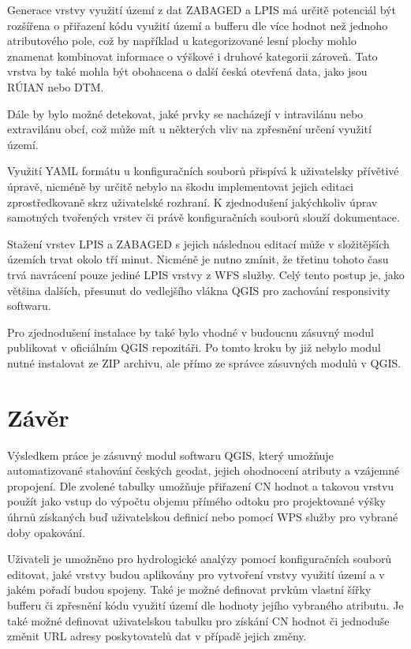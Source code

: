 \documentclass[a4paper,oneside,12pt]{book}
\begin{document}
\hspace{10mm} Generace vrstvy využití území z dat ZABAGED a LPIS má určitě potenciál být rozšířena o přiřazení kódu využití území a bufferu dle více hodnot než jednoho atributového pole, což by například u kategorizované lesní plochy mohlo znamenat kombinovat informace o výškové i druhové kategorii zároveň. Tato vrstva by také mohla být obohacena o další česká otevřená data, jako jsou RÚIAN nebo DTM.

\hspace{10mm} Dále by bylo možné detekovat, jaké prvky se nacházejí v intravilánu nebo extravilánu obcí, což může mít u některých vliv na zpřesnění určení využití území.

\hspace{10mm} Využití YAML formátu u konfiguračních souborů přispívá k uživatelsky přívětivé úpravě, nicméně by určitě nebylo na škodu implementovat jejich editaci zprostředkovaně skrz uživatelské rozhraní. K zjednodušení jakýchkoliv úprav samotných tvořených vrstev či právě konfiguračních souborů slouží dokumentace.

\hspace{10mm} Stažení vrstev LPIS a ZABAGED s jejich následnou editací může v složitějších územích trvat okolo tří minut. Nicméně je nutno zmínit, že třetinu tohoto času trvá navrácení pouze jediné LPIS vrstvy z WFS služby. Celý tento postup je, jako většina dalších, přesunut do vedlejšího vlákna QGIS pro zachování responsivity softwaru. 

\hspace{10mm} Pro zjednodušení instalace by také bylo vhodné v budoucnu zásuvný modul publikovat v oficiálním QGIS repozitáři. Po tomto kroku by již nebylo modul nutné instalovat ze ZIP archivu, ale přímo ze správce zásuvných modulů v QGIS.

\chapter*{Závěr} \label{results}
\hspace{10mm} Výsledkem práce je zásuvný modul softwaru QGIS, který umožňuje automatizované stahování českých geodat, jejich ohodnocení atributy a vzájemné propojení. Dle zvolené tabulky umožňuje přiřazení CN hodnot a takovou vrstvu použít jako vstup do výpočtu objemu přímého odtoku pro projektované výšky úhrnů získaných buď uživatelskou definicí nebo pomocí WPS služby pro vybrané doby opakování.

\hspace{10mm} Uživateli je umožněno pro hydrologické analýzy pomocí konfiguračních souborů editovat, jaké vrstvy budou aplikovány pro vytvoření vrstvy využití území a v jakém pořadí budou spojeny. Také je možné definovat prvkům vlastní šířky bufferu či zpřesnění kódu využití území dle hodnoty jejího vybraného atributu. Je také možné definovat uživatelskou tabulku pro získání CN hodnot či jednoduše změnit URL adresy poskytovatelů dat v případě jejich změny.
\end{document}
